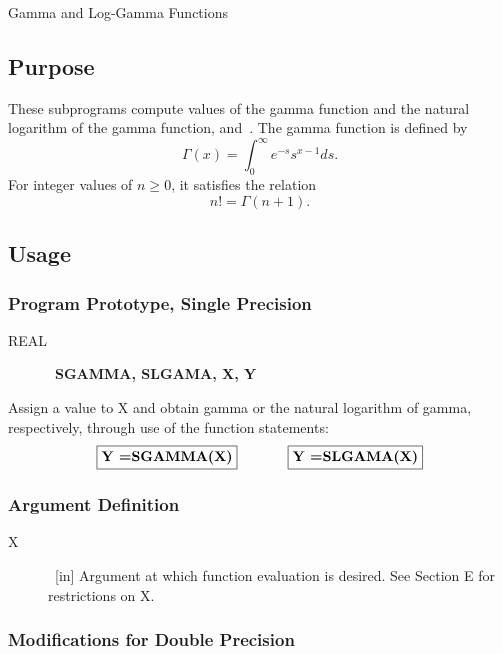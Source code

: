 \documentclass[twoside]{MATH77}
\begin{document}
 Gamma and Log-Gamma Functions


\subsection{Purpose}

These subprograms compute values of the gamma function and the natural
logarithm of the gamma function, \cite{ams55} and~\cite{Hart:1968:CA:gam}.
The gamma function is defined by%
\begin{equation*}
\Gamma (x)=\int_0^\infty e^{-s}s^{x-1}ds.
\end{equation*}
For integer values of $n\geq 0$, it satisfies the relation
\begin{equation*}
n!=\Gamma (n+1).
\end{equation*}
\subsection{Usage}

\subsubsection{Program Prototype, Single Precision}

\begin{description}
\item[REAL]  \ {\bf SGAMMA, SLGAMA, X, Y}
\end{description}

Assign a value to X and obtain gamma or the natural logarithm of gamma,
respectively, through use of the function statements:
$$
\fbox{{\bf Y =SGAMMA(X)}} \hspace{.5in} \fbox{{\bf Y =SLGAMA(X)}}
$$

\subsubsection{Argument Definition}

\begin{description}
\item[X]  \ [in] Argument at which function evaluation is desired. See
Section E for restrictions on X.
\end{description}

\subsubsection{Modifications for Double Precision}
\end{document}
